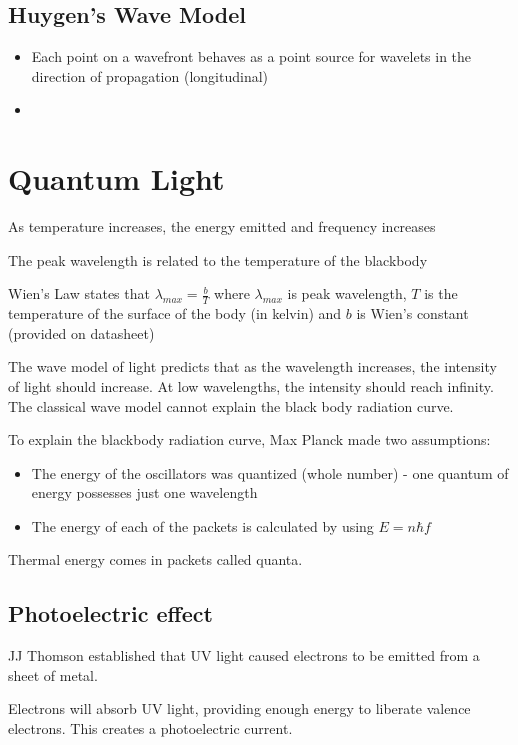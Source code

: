 	\subsection{Huygen's Wave Model}
	
		\begin{itemize}
			\item Each point on a wavefront behaves as a point source for wavelets in the direction of propagation (longitudinal)
			\item 
		\end{itemize}

\section{Quantum Light}

	As temperature increases, the energy emitted and frequency increases

	The peak wavelength is related to the temperature of the blackbody
	
	Wien's Law states that $\lambda _{max} = \frac{b}{T}$ where $\lambda _{max}$ is peak wavelength, $T$ is the temperature of the surface of the body (in kelvin) and $b$ is Wien's constant (provided on datasheet)

	The wave model of light predicts that as the wavelength increases, the intensity of light should increase. At low wavelengths, the intensity should reach infinity. The classical wave model cannot explain the black body radiation curve.

	To explain the blackbody radiation curve, Max Planck made two assumptions:

		\begin{itemize}
			\item The energy of the oscillators was quantized (whole number) - one quantum of energy possesses just one wavelength
			\item The energy of each of the packets is calculated by using $E = n\hbar f$
		\end{itemize}

	Thermal energy comes in packets called quanta.

	\subsection{Photoelectric effect}
	
		JJ Thomson established that UV light caused electrons to be emitted from a sheet of metal.

		Electrons will absorb UV light, providing enough energy to liberate valence electrons. This creates a photoelectric current.

